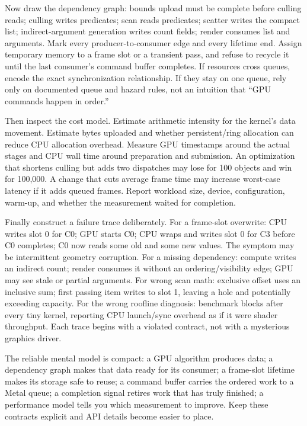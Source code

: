 Now draw the dependency graph: bounds upload must be complete before culling reads; culling writes predicates; scan reads predicates; scatter writes the compact list; indirect-argument generation writes count fields; render consumes list and arguments. Mark every producer-to-consumer edge and every lifetime end. Assign temporary memory to a frame slot or a transient pass, and refuse to recycle it until the last consumer's command buffer completes. If resources cross queues, encode the exact synchronization relationship. If they stay on one queue, rely only on documented queue and hazard rules, not an intuition that ``GPU commands happen in order.''

Then inspect the cost model. Estimate arithmetic intensity for the kernel's data movement. Estimate bytes uploaded and whether persistent/ring allocation can reduce CPU allocation overhead. Measure GPU timestamps around the actual stages and CPU wall time around preparation and submission. An optimization that shortens culling but adds two dispatches may lose for 100 objects and win for 100,000. A change that cuts average frame time may increase worst-case latency if it adds queued frames. Report workload size, device, configuration, warm-up, and whether the measurement waited for completion.

Finally construct a failure trace deliberately. For a frame-slot overwrite: CPU writes slot 0 for C0; GPU starts C0; CPU wraps and writes slot 0 for C3 before C0 completes; C0 now reads some old and some new values. The symptom may be intermittent geometry corruption. For a missing dependency: compute writes an indirect count; render consumes it without an ordering/visibility edge; GPU may see stale or partial arguments. For wrong scan math: exclusive offset uses an inclusive sum; first passing item writes to slot 1, leaving a hole and potentially exceeding capacity. For the wrong roofline diagnosis: benchmark blocks after every tiny kernel, reporting CPU launch/sync overhead as if it were shader throughput. Each trace begins with a violated contract, not with a mysterious graphics driver.

The reliable mental model is compact: a GPU algorithm produces data; a dependency graph makes that data ready for its consumer; a frame-slot lifetime makes its storage safe to reuse; a command buffer carries the ordered work to a Metal queue; a completion signal retires work that has truly finished; a performance model tells you which measurement to improve. Keep these contracts explicit and API details become easier to place.

